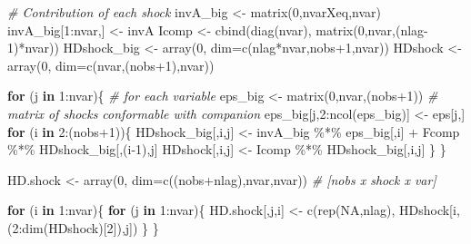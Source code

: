 \documentclass[
]{book}
\newenvironment{Shaded}{\begin{snugshade}}{\end{snugshade}}
\newcommand{\AttributeTok}[1]{\textcolor[rgb]{0.77,0.63,0.00}{#1}}
\newcommand{\CommentTok}[1]{\textcolor[rgb]{0.56,0.35,0.01}{\textit{#1}}}
\newcommand{\ConstantTok}[1]{\textcolor[rgb]{0.00,0.00,0.00}{#1}}
\newcommand{\ControlFlowTok}[1]{\textcolor[rgb]{0.13,0.29,0.53}{\textbf{#1}}}
\newcommand{\DecValTok}[1]{\textcolor[rgb]{0.00,0.00,0.81}{#1}}
\newcommand{\FunctionTok}[1]{\textcolor[rgb]{0.00,0.00,0.00}{#1}}
\newcommand{\NormalTok}[1]{#1}
\newcommand{\OtherTok}[1]{\textcolor[rgb]{0.56,0.35,0.01}{#1}}
\newcommand{\SpecialCharTok}[1]{\textcolor[rgb]{0.00,0.00,0.00}{#1}}
\begin{document}
\begin{Shaded}
\begin{Highlighting}[]
\CommentTok{\# Contribution of each shock}
\NormalTok{invA\_big    }\OtherTok{\textless{}{-}} \FunctionTok{matrix}\NormalTok{(}\DecValTok{0}\NormalTok{,nvarXeq,nvar)}
\NormalTok{invA\_big[}\DecValTok{1}\SpecialCharTok{:}\NormalTok{nvar,] }\OtherTok{\textless{}{-}}\NormalTok{ invA}
\NormalTok{Icomp       }\OtherTok{\textless{}{-}} \FunctionTok{cbind}\NormalTok{(}\FunctionTok{diag}\NormalTok{(nvar), }\FunctionTok{matrix}\NormalTok{(}\DecValTok{0}\NormalTok{,nvar,(nlag}\DecValTok{{-}1}\NormalTok{)}\SpecialCharTok{*}\NormalTok{nvar))}
\NormalTok{HDshock\_big }\OtherTok{\textless{}{-}} \FunctionTok{array}\NormalTok{(}\DecValTok{0}\NormalTok{, }\AttributeTok{dim=}\FunctionTok{c}\NormalTok{(nlag}\SpecialCharTok{*}\NormalTok{nvar,nobs}\SpecialCharTok{+}\DecValTok{1}\NormalTok{,nvar))}
\NormalTok{HDshock     }\OtherTok{\textless{}{-}} \FunctionTok{array}\NormalTok{(}\DecValTok{0}\NormalTok{, }\AttributeTok{dim=}\FunctionTok{c}\NormalTok{(nvar,(nobs}\SpecialCharTok{+}\DecValTok{1}\NormalTok{),nvar))}

\ControlFlowTok{for}\NormalTok{ (j }\ControlFlowTok{in} \DecValTok{1}\SpecialCharTok{:}\NormalTok{nvar)\{  }\CommentTok{\# for each variable}
\NormalTok{  eps\_big }\OtherTok{\textless{}{-}} \FunctionTok{matrix}\NormalTok{(}\DecValTok{0}\NormalTok{,nvar,(nobs}\SpecialCharTok{+}\DecValTok{1}\NormalTok{)) }\CommentTok{\# matrix of shocks conformable with companion}
\NormalTok{  eps\_big[j,}\DecValTok{2}\SpecialCharTok{:}\FunctionTok{ncol}\NormalTok{(eps\_big)] }\OtherTok{\textless{}{-}}\NormalTok{ eps[j,]}
  \ControlFlowTok{for}\NormalTok{ (i }\ControlFlowTok{in} \DecValTok{2}\SpecialCharTok{:}\NormalTok{(nobs}\SpecialCharTok{+}\DecValTok{1}\NormalTok{))\{}
\NormalTok{    HDshock\_big[,i,j] }\OtherTok{\textless{}{-}}\NormalTok{ invA\_big }\SpecialCharTok{\%*\%}\NormalTok{ eps\_big[,i] }\SpecialCharTok{+}\NormalTok{ Fcomp }\SpecialCharTok{\%*\%}\NormalTok{ HDshock\_big[,(i}\DecValTok{{-}1}\NormalTok{),j]}
\NormalTok{    HDshock[,i,j] }\OtherTok{\textless{}{-}}\NormalTok{  Icomp }\SpecialCharTok{\%*\%}\NormalTok{ HDshock\_big[,i,j]}
\NormalTok{  \} }
\NormalTok{\} }

\NormalTok{HD.shock }\OtherTok{\textless{}{-}} \FunctionTok{array}\NormalTok{(}\DecValTok{0}\NormalTok{, }\AttributeTok{dim=}\FunctionTok{c}\NormalTok{((nobs}\SpecialCharTok{+}\NormalTok{nlag),nvar,nvar))   }\CommentTok{\# [nobs x shock x var]}

\ControlFlowTok{for}\NormalTok{ (i }\ControlFlowTok{in} \DecValTok{1}\SpecialCharTok{:}\NormalTok{nvar)\{}
    \ControlFlowTok{for}\NormalTok{ (j }\ControlFlowTok{in} \DecValTok{1}\SpecialCharTok{:}\NormalTok{nvar)\{}
\NormalTok{      HD.shock[,j,i] }\OtherTok{\textless{}{-}} \FunctionTok{c}\NormalTok{(}\FunctionTok{rep}\NormalTok{(}\ConstantTok{NA}\NormalTok{,nlag), HDshock[i,(}\DecValTok{2}\SpecialCharTok{:}\FunctionTok{dim}\NormalTok{(HDshock)[}\DecValTok{2}\NormalTok{]),j])}
\NormalTok{  \}}
\NormalTok{\}}


\end{Highlighting}
\end{Shaded}
\end{document}

